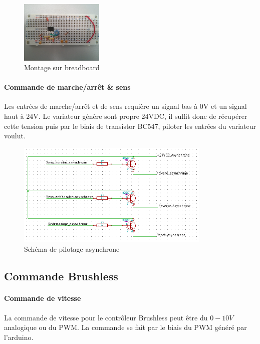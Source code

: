 \documentclass[11pt]{article}
\begin{document}
\begin{figure}[!h]
    \centering
    \includegraphics[width=150px]{IMG_20160629_203955.jpg}
    \caption{Montage sur breadboard}
\end{figure}

\paragraph{Commande de marche/arrêt \& sens\\}

Les entrées de marche/arrêt et de sens requière un signal bas à 0V et un signal haut à 24V. Le variateur génère sont propre 24VDC, il suffit donc de récupérer cette tension puis par le biais de transistor BC547, piloter les entrées du variateur voulut.

\begin{figure}[!h]
    \centering
    \includegraphics[width=350px]{schema_pilotage_asynchrone.png}
    \caption{Schéma de pilotage asynchrone}
\end{figure}


\subsection{Commande Brushless}

\paragraph{Commande de vitesse \\}

La commande de vitesse pour le contrôleur Brushless peut être du $0-10V$ analogique ou du PWM. La commande se fait par le biais du PWM généré par l'arduino.
\end{document}
